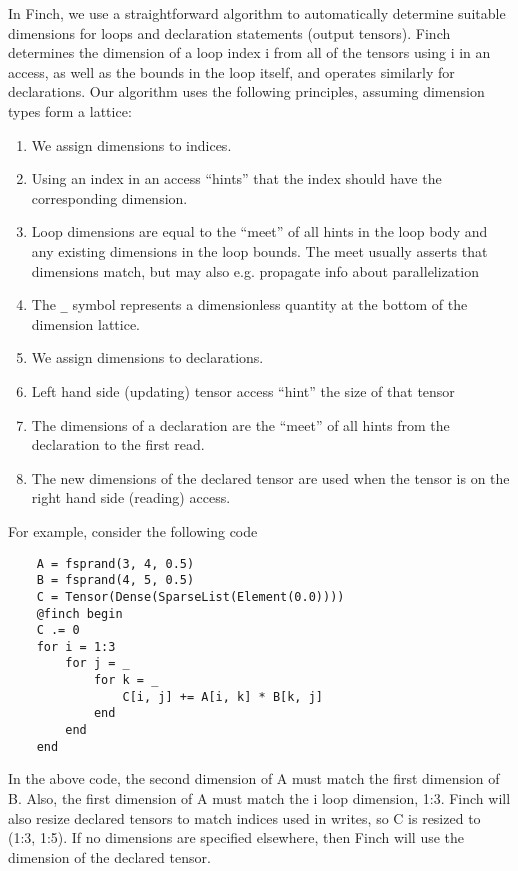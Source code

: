     

    In Finch, we use a straightforward algorithm to automatically determine suitable dimensions for loops and declaration statements (output tensors).
    Finch determines the dimension of a loop index i from all of the tensors using i in an access, as well as the bounds in the loop itself, and operates similarly for declarations.
    Our algorithm uses the following principles, assuming dimension types form a lattice:
    \begin{enumerate}
        \item We assign dimensions to indices.
        \item Using an index in an access “hints” that the index should have the corresponding dimension.
        \item Loop dimensions are equal to the “meet” of all hints in the loop body
        and any existing dimensions in the loop bounds. The meet usually asserts
        that dimensions match, but may also e.g. propagate info about parallelization
        \item The \texttt{_} symbol represents a dimensionless quantity at the bottom of the dimension lattice.
        \item We assign dimensions to declarations.
        \item Left hand side (updating) tensor access “hint” the size of that tensor
        \item The dimensions of a declaration are the “meet” of all hints from
        the declaration to the first read.
        \item The new dimensions of the declared tensor are used when the tensor is on the right hand side (reading)
        access.
    \end{enumerate}

    For example, consider the following code
    
    \begin{verbatim}
    A = fsprand(3, 4, 0.5)
    B = fsprand(4, 5, 0.5)
    C = Tensor(Dense(SparseList(Element(0.0))))
    @finch begin
    C .= 0
    for i = 1:3
        for j = _
            for k = _
                C[i, j] += A[i, k] * B[k, j]
            end
        end
    end
    \end{verbatim}
    
    In the above code, the second dimension of A must match the first dimension of B. Also, the first dimension of A must match the i loop dimension, 1:3. Finch will also resize declared tensors to match indices used in writes, so C is resized to (1:3, 1:5). If no dimensions are specified elsewhere, then Finch will use the dimension of the declared tensor.
    
